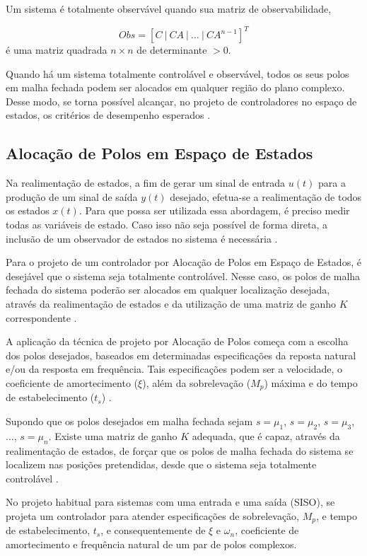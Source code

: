 \documentclass[journal,brazil,english]{IEEEtran}
\begin{document}
Um sistema é totalmente observável quando sua matriz de observabilidade,

\begin{equation}
Obs=\left[C~|~CA~|~\ldots~|~CA^{n-1}\right]^T
\end{equation}
é uma matriz quadrada $n\times n$ de determinante $>0$.

Quando há um sistema totalmente controlável e observável, todos os seus polos em malha fechada podem ser alocados em qualquer região do plano complexo. Desse modo, se torna possível alcançar, no projeto de controladores no espaço de estados, os critérios de desempenho esperados \cite{dorf}.

\subsection{Alocação de Polos em Espaço de Estados}\label{alocacaoEE}
Na realimentação de estados, a fim de gerar um sinal de entrada $u(t)$ para a produção de um sinal de saída $y(t)$ desejado, efetua-se a realimentação de todos os estados $x(t)$. Para que possa ser utilizada essa abordagem, é preciso medir todas as variáveis de estado. Caso isso não seja possível de forma direta, a inclusão de um observador de estados no sistema é necessária \cite{ogata}.

Para o projeto de um controlador por Alocação de Polos em Espaço de Estados, é desejável que o sistema seja totalmente controlável. Nesse caso, os polos de malha fechada do sistema poderão ser alocados em qualquer localização desejada, através da realimentação de estados e da utilização de uma matriz de ganho $K$ correspondente \cite{ogata}.

A aplicação da técnica de projeto por Alocação de Polos começa com a escolha dos polos desejados, baseados em determinadas especificações da reposta natural e/ou da resposta em frequência. Tais especificações podem ser a velocidade, o coeficiente de amortecimento ($\xi$), além da sobrelevação ($M_p$) máxima  e do tempo de estabelecimento ($t_s$) \cite{ogata}.

Supondo que os polos desejados em malha fechada sejam $s=\mu _1$, $s=\mu _2$, $s=\mu _3$, $\ldots$, $s=\mu _n$. Existe uma matriz de ganho $K$ adequada, que é capaz, através da realimentação de estados, de forçar que os polos de malha fechada do sistema se localizem nas posições pretendidas, desde que o sistema seja totalmente controlável \cite{ogata}.

No projeto habitual para sistemas com uma entrada e uma saída (SISO), se projeta um controlador para atender especificações de sobrelevação, $M_p$, e tempo de estabelecimento, $t_s$, e consequentemente de $\xi$ e $\omega _n$, coeficiente de amortecimento e frequência natural de um par de polos complexos.
\end{document}

